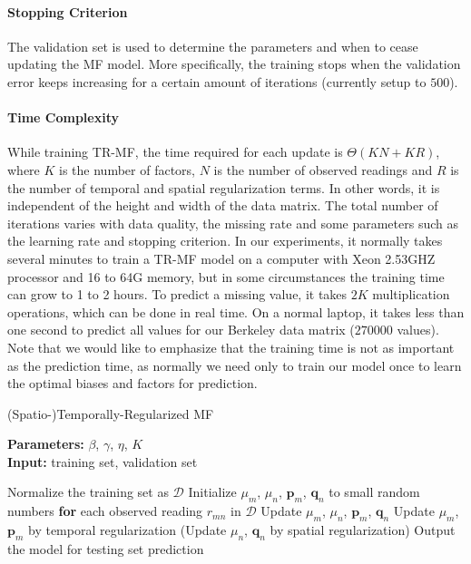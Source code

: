 \paragraph*{Stopping Criterion}
The validation set is used to determine the parameters and when to cease updating the MF model. More specifically, the training stops when the validation error keeps increasing for a certain amount of iterations (currently setup to $500$). 

\paragraph*{Time Complexity}
While training TR-MF, the time required for each update is $\Theta(KN + KR)$, where $K$ is the number of factors, $N$ is the number of observed readings and $R$ is the number of temporal and spatial regularization terms.
In other words, it is independent of the height and width of the data matrix. 
The total number of iterations varies with data quality, the missing rate and some parameters such as the learning rate and stopping criterion.
In our experiments, it normally takes several minutes to train a TR-MF model on a computer with Xeon 2.53GHZ processor and 16 to 64G memory, but in some circumstances the training time can grow to 1 to 2 hours.
To predict a missing value, it takes $2K$ multiplication operations, which can be done in real time. 
On a normal laptop, it takes less than one second to predict all values for our Berkeley data matrix ($270000$ values).
Note that we would like to emphasize that the training time is not as important as the prediction time, as normally we need only to train our model once to learn the optimal biases and factors for prediction.

\begin{algorithm}
	\caption{(Spatio-)Temporally-Regularized MF}
	\label{alg:STRMF}
	\textbf{Parameters:} $\beta$, $\gamma$, $\eta$, $K$\\
	\textbf{Input:} training set, validation set
	\begin{algorithmic}
		\State Normalize the training set as $\mathcal{D}$
		\State Initialize $\mu_m$, $\mu_n$, $\mathbf{p}_m$, $\mathbf{q}_n$ to small random numbers
		\Repeat
			\State \textbf{for} each observed reading $r_{mn}$ in $\mathcal{D}$
				\State \indent Update $\mu_m$, $\mu_n$, $\mathbf{p}_{m}$, $\mathbf{q}_{n}$
			\State Update $\mu_m$, $\mathbf{p}_m$ by temporal regularization
			\State (Update $\mu_n$, $\mathbf{q}_n$ by spatial regularization)
		\State Output the model for testing set prediction
	\end{algorithmic}
\end{algorithm}
